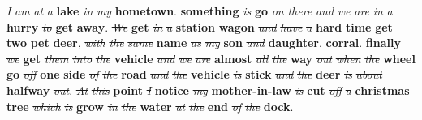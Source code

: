 \begin{minipage}[t]{0.75\textwidth}
    \begin{spacing}{0.5}
    {\scriptsize
    \sout{\it I} \sout{\it am} \sout{\it at} \sout{\it a} \textbf{\color{orangeUnicam}lake} \sout{\it in} \sout{\it my} \textbf{\color{orangeUnicam} hometown}.
    \textbf{\color{orangeUnicam}something} \sout{\it is} \textbf{\color{orangeUnicam}go} \sout{\it on} \sout{\it there} \sout{\it and} \sout{\it we} \sout{\it are} \sout{\it in}
    \sout{\it a} \textbf{\color{orangeUnicam}hurry} \sout{\it to} \textbf{\color{orangeUnicam}get} \textbf{\color{orangeUnicam}away}.
    \sout{\it We} \textbf{\color{orangeUnicam}get} \sout{\it in} \sout{\it a} \textbf{\color{orangeUnicam}station} \textbf{\color{orangeUnicam}wagon} \sout{\it and} \sout{\it have} \sout{\it a}
    \textbf{\color{orangeUnicam}hard} \textbf{\color{orangeUnicam}time} \textbf{\color{orangeUnicam}get} \textbf{\color{orangeUnicam}two} \textbf{\color{orangeUnicam}pet} \textbf{\color{orangeUnicam}deer}, \sout{\it with} \sout{\it the}
    \sout{\it same} \textbf{\color{orangeUnicam}name} \sout{\it as} \sout{\it my} \textbf{\color{orangeUnicam}son} \sout{\it and} \textbf{\color{orangeUnicam}daughter}, \textbf{\color{orangeUnicam}corral}.
    \textbf{\color{orangeUnicam}finally} \sout{\it we} \textbf{\color{orangeUnicam}get} \sout{\it them} \sout{\it into} \sout{\it the} \textbf{\color{orangeUnicam}vehicle} \sout{\it and} \sout{\it we}
    \sout{\it are} \textbf{\color{orangeUnicam}almost} \sout{\it all} \sout{\it the} \textbf{\color{orangeUnicam}way} \sout{\it out} \sout{\it when} \sout{\it the} \textbf{\color{orangeUnicam}wheel}
    \textbf{\color{orangeUnicam}go} \sout{\it off} \textbf{\color{orangeUnicam}one} \textbf{\color{orangeUnicam}side} \sout{\it of} \sout{\it the} \textbf{\color{orangeUnicam}road}
    \sout{\it and} \sout{\it the} \textbf{\color{orangeUnicam}vehicle} \sout{\it is} \textbf{\color{orangeUnicam}stick} \sout{\it and} \sout{\it the} \textbf{\color{orangeUnicam}deer} \sout{\it is}
    \sout{\it about} \textbf{\color{orangeUnicam}halfway} \sout{\it out}.
    \sout{\it At} \sout{\it this} \textbf{\color{orangeUnicam}point} \sout{\it I} \textbf{\color{orangeUnicam}notice} \sout{\it my} \textbf{\color{orangeUnicam}mother-in-law} \sout{\it is}
    \textbf{\color{orangeUnicam}cut} \sout{\it off} \sout{\it a} \textbf{\color{orangeUnicam}christmas} \textbf{\color{orangeUnicam}tree} \sout{\it which} \sout{\it is} \textbf{\color{orangeUnicam}grow}
    \sout{\it in} \sout{\it the} \linebreak \textbf{\color{orangeUnicam}water} \sout{\it at} \sout{\it the} \textbf{\color{orangeUnicam}end} \sout{\it of} \sout{\it the} \textbf{\color{orangeUnicam}dock}}.
    \end{spacing}
\end{minipage}
